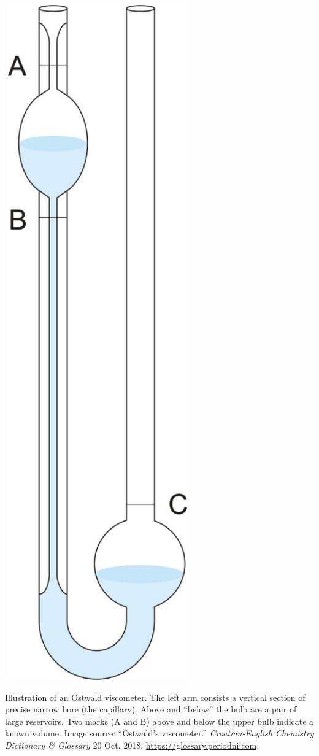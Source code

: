\begin{marginfigure}
	\centering
	\includegraphics[width=0.6\textwidth]{images/ostwald_viscometer.png}
	\caption{Illustration of an Ostwald viscometer. 
		The left arm consists a vertical section of precise narrow bore (the capillary). 
		Above and ``below'' the bulb are a pair of large reservoirs.
		Two marks (A and B) above and below the upper bulb indicate a known volume. 
		\footnotesize{Image source: ``Ostwald’s viscometer.'' \emph{Croatian-English Chemistry Dictionary \& Glossary} 20 Oct. 2018. \url{https://glossary.periodni.com}.}}
	\label{fig:viscometer}
\end{marginfigure} 

